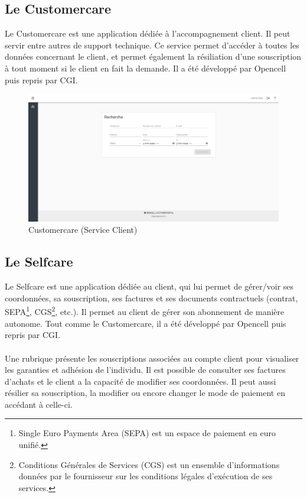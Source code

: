 \documentclass[12pt, a4paper]{report}
\begin{document}
	\newpage
	\subsection{Le Customercare}
	Le Customercare est une application dédiée à l'accompagnement client. Il peut servir entre autres de support technique. Ce service permet d'accéder à toutes les données concernant le client, et permet également la résiliation d'une souscription à tout moment si le client en fait la demande. Il a été développé par Opencell puis repris par CGI.
	\\
	\begin{figure}[!h]
		\centering
		\includegraphics[width=1\textwidth]{assets/images/customercare.png}
		\vspace{-.6cm}
		\caption{Customercare (Service Client)}
	\end{figure}

	\newpage
	\subsection{Le Selfcare}
	Le Selfcare est une application dédiée au client, qui lui permet de gérer/voir ses coordonnées, sa souscription, ses factures et ses documents contractuels (contrat, SEPA\footnote{Single Euro Payments Area (SEPA) est un espace de paiement en euro unifié.}, CGS\footnote{Conditions Générales de Services (CGS) est un ensemble d'informations données par le fournisseur sur les conditions légales d'exécution de ses services.}, etc.). Il permet au client de gérer son abonnement de manière autonome. Tout comme le Customercare, il a été développé par Opencell puis repris par CGI.
	\\\\
	Une rubrique présente les souscriptions associées au compte client pour visualiser les garanties et adhésion de l'individu. Il est possible de consulter ses factures d'achats et le client a la capacité de modifier ses coordonnées. Il peut aussi résilier sa souscription, la modifier ou encore changer le mode de paiement en accédant à celle-ci.
\end{document}
